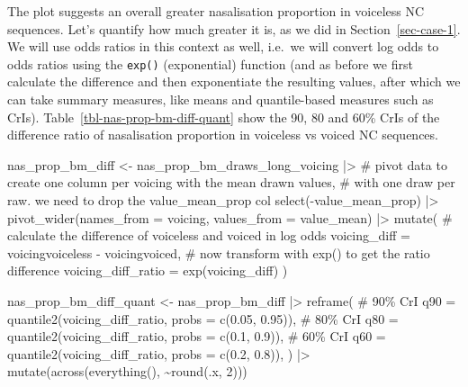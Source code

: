 \documentclass[
  authoryear,
  preprint,
  3p]{elsarticle}
\newenvironment{Shaded}{\begin{snugshade}}{\end{snugshade}}
\newcommand{\AttributeTok}[1]{\textcolor[rgb]{0.40,0.45,0.13}{#1}}
\newcommand{\CommentTok}[1]{\textcolor[rgb]{0.37,0.37,0.37}{#1}}
\newcommand{\DecValTok}[1]{\textcolor[rgb]{0.68,0.00,0.00}{#1}}
\newcommand{\FloatTok}[1]{\textcolor[rgb]{0.68,0.00,0.00}{#1}}
\newcommand{\FunctionTok}[1]{\textcolor[rgb]{0.28,0.35,0.67}{#1}}
\newcommand{\NormalTok}[1]{\textcolor[rgb]{0.00,0.23,0.31}{#1}}
\newcommand{\OtherTok}[1]{\textcolor[rgb]{0.00,0.23,0.31}{#1}}
\newcommand{\SpecialCharTok}[1]{\textcolor[rgb]{0.37,0.37,0.37}{#1}}
\begin{document}
The plot suggests an overall greater nasalisation proportion in
voiceless NC sequences. Let's quantify how much greater it is, as we did
in Section~\ref{sec-case-1}. We will use odds ratios in this context as
well, i.e.~we will convert log odds to odds ratios using the
\texttt{exp()} (exponential) function (and as before we first calculate
the difference and then exponentiate the resulting values, after which
we can take summary measures, like means and quantile-based measures
such as CrIs). Table~\ref{tbl-nas-prop-bm-diff-quant} show the 90, 80
and 60\% CrIs of the difference ratio of nasalisation proportion in
voiceless vs voiced NC sequences.

\begin{Shaded}
\begin{Highlighting}[]
\NormalTok{nas\_prop\_bm\_diff }\OtherTok{\textless{}{-}}\NormalTok{ nas\_prop\_bm\_draws\_long\_voicing }\SpecialCharTok{|\textgreater{}} 
  \CommentTok{\# pivot data to create one column per voicing with the mean drawn values,}
  \CommentTok{\# with one draw per raw. we need to drop the value\_mean\_prop col}
  \FunctionTok{select}\NormalTok{(}\SpecialCharTok{{-}}\NormalTok{value\_mean\_prop) }\SpecialCharTok{|\textgreater{}} 
  \FunctionTok{pivot\_wider}\NormalTok{(}\AttributeTok{names\_from =}\NormalTok{ voicing, }\AttributeTok{values\_from =}\NormalTok{ value\_mean) }\SpecialCharTok{|\textgreater{}} 
  \FunctionTok{mutate}\NormalTok{(}
    \CommentTok{\# calculate the difference of voiceless and voiced in log odds}
    \AttributeTok{voicing\_diff =}\NormalTok{ voicingvoiceless }\SpecialCharTok{{-}}\NormalTok{ voicingvoiced,}
    \CommentTok{\# now transform with exp() to get the ratio difference}
    \AttributeTok{voicing\_diff\_ratio =} \FunctionTok{exp}\NormalTok{(voicing\_diff)}
\NormalTok{  )}

\NormalTok{nas\_prop\_bm\_diff\_quant }\OtherTok{\textless{}{-}}\NormalTok{ nas\_prop\_bm\_diff }\SpecialCharTok{|\textgreater{}} 
  \FunctionTok{reframe}\NormalTok{(}
    \CommentTok{\# 90\% CrI}
    \AttributeTok{q90 =} \FunctionTok{quantile2}\NormalTok{(voicing\_diff\_ratio, }\AttributeTok{probs =} \FunctionTok{c}\NormalTok{(}\FloatTok{0.05}\NormalTok{, }\FloatTok{0.95}\NormalTok{)),}
    \CommentTok{\# 80\% CrI}
    \AttributeTok{q80 =} \FunctionTok{quantile2}\NormalTok{(voicing\_diff\_ratio, }\AttributeTok{probs =} \FunctionTok{c}\NormalTok{(}\FloatTok{0.1}\NormalTok{, }\FloatTok{0.9}\NormalTok{)),}
    \CommentTok{\# 60\% CrI}
    \AttributeTok{q60 =} \FunctionTok{quantile2}\NormalTok{(voicing\_diff\_ratio, }\AttributeTok{probs =} \FunctionTok{c}\NormalTok{(}\FloatTok{0.2}\NormalTok{, }\FloatTok{0.8}\NormalTok{)),}
\NormalTok{  ) }\SpecialCharTok{|\textgreater{}} 
  \FunctionTok{mutate}\NormalTok{(}\FunctionTok{across}\NormalTok{(}\FunctionTok{everything}\NormalTok{(), }\SpecialCharTok{\textasciitilde{}}\FunctionTok{round}\NormalTok{(.x, }\DecValTok{2}\NormalTok{)))}
\end{Highlighting}
\end{Shaded}
\end{document}
